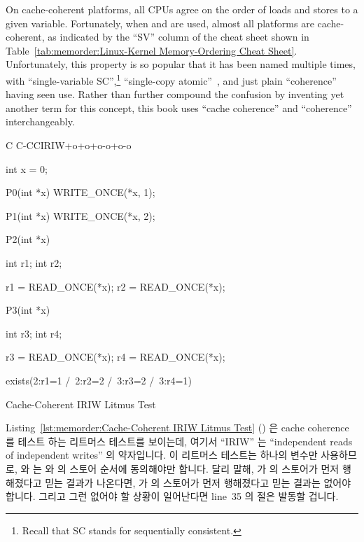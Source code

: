 On cache-coherent platforms, all CPUs agree on the order of loads and
stores to a given variable.
Fortunately, when  and  are used,
almost all platforms are cache-coherent, as indicated by the ``SV''
column of the cheat sheet shown in
Table~\ref{tab:memorder:Linux-Kernel Memory-Ordering Cheat Sheet}.
Unfortunately, this property is so popular that it has been named
multiple times, with ``single-variable SC'',\footnote{
	Recall that SC stands for sequentially consistent.}
``single-copy atomic''~\cite{Stone:1995:SP:623262.623912},
and just plain ``coherence''~\cite{JadeAlglave2011ppcmem}
having seen use.
Rather than further compound the confusion by inventing yet another term
for this concept, this book uses ``cache coherence'' and ``coherence''
interchangeably.
\fi

\begin{listing}[tbp]
{ \scriptsize
\begin{verbbox}[\LstLineNo]
C C-CCIRIW+o+o+o-o+o-o

{
int x = 0;
}

P0(int *x)
{
  WRITE_ONCE(*x, 1);
}

P1(int *x)
{
  WRITE_ONCE(*x, 2);
}

P2(int *x)
{
  int r1;
  int r2;

  r1 = READ_ONCE(*x);
  r2 = READ_ONCE(*x);
}

P3(int *x)
{
  int r3;
  int r4;

  r3 = READ_ONCE(*x);
  r4 = READ_ONCE(*x);
}

exists(2:r1=1 /\ 2:r2=2 /\ 3:r3=2 /\ 3:r4=1)
\end{verbbox}
}
\centering
\theverbbox
\caption{Cache-Coherent IRIW Litmus Test}
\label{lst:memorder:Cache-Coherent IRIW Litmus Test}
\end{listing}

Listing~\ref{lst:memorder:Cache-Coherent IRIW Litmus Test}
()
은 cache coherence 를 테스트 하는 리트머스 테스트를 보이는데, 여기서 ``IRIW''
는 ``independent reads of independent writes'' 의 약자입니다.
이 리트머스 테스트는 하나의 변수만 사용하므로,  와  는
 와  의 스토어 순서에 동의해야만 합니다.
달리 말해,  가  의 스토어가 먼저 행해졌다고 믿는 결과가
나온다면,  가  의 스토어가 먼저 행해졌다고 믿는 결과는 없어야
합니다.
그리고 그런 없어야 할 상황이 일어난다면 line~35 의  절은 발동할
겁니다.

